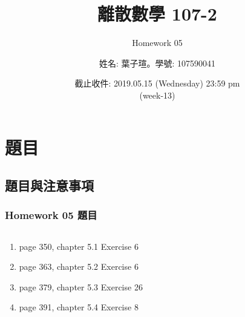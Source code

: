 \documentclass[14pt,hyperref={bookmarks=false}]{beamer}
\title{離散數學 107-2}
\subtitle{Homework 05}
\author{姓名: 葉子瑄。學號: 107590041}
\date{截止收件: 2019.05.15 (Wednesday) 23:59 pm \\ (week-13)}
\begin{document}

\begin{frame}
\titlepage
\end{frame}

\raggedright

\begin{frame}
\footnotesize
\tableofcontents
\end{frame}
	
\section{題目}

	\subsection{題目與注意事項}
	
	\begin{frame}
	\frametitle{Homework 05 題目}
	\fontsize{11pt}{12pt}\selectfont
	\setlength{\baselineskip}{5pt}
	\begin{columns}
	\begin{column}{0.68\textwidth}
	\begin{enumerate}[label=(Prob. \arabic*)]
	\setlength\itemsep{0em}
	\item page 350, chapter 5.1 Exercise 6
	\item page 363, chapter 5.2 Exercise 6
	\item page 379, chapter 5.3 Exercise 26 
	\item page 391, chapter 5.4 Exercise 8
	\end{enumerate}
	\end{column}
	
	
	\end{columns}
	\end{frame}
	
\end{document}
